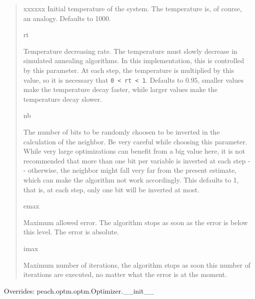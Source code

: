 \begin{boxedminipage}{\textwidth}
\begin{quote}
\begin{Ventry}{xxxxxx}
Initial temperature of the system. The temperature is, of course, an
analogy. Defaults to 1000.
          \item[rt]


Temperature decreasing rate. The temperature must slowly decrease in
simulated annealing algorithms. In this implementation, this is
controlled by this parameter. At each step, the temperature is
multiplied by this value, so it is necessary that \texttt{0 < rt < 1}.
Defaults to 0.95, smaller values make the temperature decay faster,
while larger values make the temperature decay slower.
          \item[nb]


The number of bits to be randomly choosen to be inverted in the
calculation of the neighbor. Be very careful while choosing this
parameter. While very large optimizations can benefit from a big
value here, it is not recommended that more than one bit per
variable is inverted at each step -{}- otherwise, the neighbor might
fall very far from the present estimate, which can make the
algorithm not work accordingly. This defaults to 1, that is, at each
step, only one bit will be inverted at most.
          \item[emax]


Maximum allowed error. The algorithm stops as soon as the error is
below this level. The error is absolute.
          \item[imax]


Maximum number of iterations, the algorithm stops as soon this
number of iterations are executed, no matter what the error is at
the moment.
        \end{Ventry}

      \end{quote}

    \vspace{1ex}

      Overrides: peach.optm.optm.Optimizer.\_\_init\_\_

    \end{boxedminipage}

    \vspace{0.5ex}

